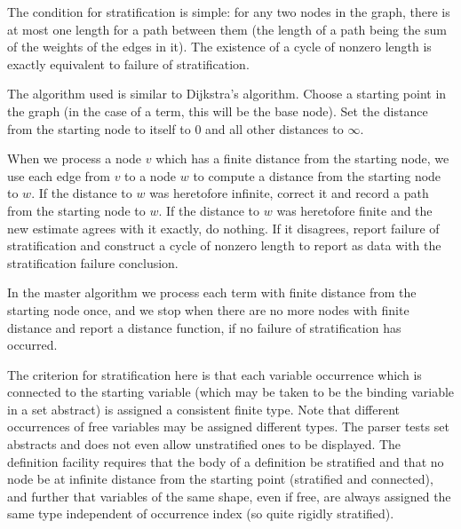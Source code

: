 \documentclass{article}
\begin{document}
The condition for stratification is simple:  for any two nodes in the graph, there is at most one length for a path between them (the length of a path being the sum of the weights of the edges in it).  The existence of a cycle of nonzero length
is exactly equivalent to failure of stratification.

The algorithm used is similar to Dijkstra's algorithm.  Choose a starting point in the graph (in the case of a term, this will be the base node).  Set the distance from the starting node to itself to 0 and all other distances to $\infty$.

When we process a node $v$ which has a finite distance from the starting node, we use each edge from $v$ to
a node $w$ to compute a distance from the starting node to $w$.  If the distance to $w$ was heretofore infinite, correct it and record a path from the starting node to $w$.  If the distance to $w$ was heretofore finite and the new estimate agrees with it exactly, do nothing.  If it disagrees, report failure of stratification and construct a cycle of nonzero length to report as data with the stratification failure conclusion.

In the master algorithm we process each term with finite distance from the starting node once, and we stop when there are no more nodes with finite distance and report a distance function, if no failure of stratification has occurred.

The criterion for stratification here is that each variable occurrence which is connected to the starting variable (which may be taken to be the binding variable in a set abstract) is assigned a consistent finite type.  Note that different occurrences of free variables may be assigned different types.  The parser tests set abstracts and does
not even allow unstratified ones to be displayed.  The definition facility requires that the body of a definition be stratified and that no node be at infinite distance from the starting point (stratified and connected), and further that variables of the same shape, even if free, are always assigned the same type independent of occurrence index (so quite rigidly stratified).
\end{document}
